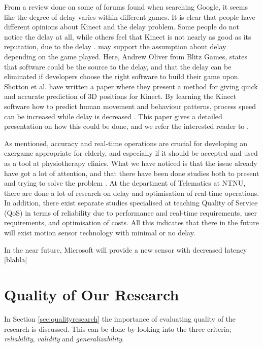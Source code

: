 From a review done on some of forums found when searching Google, it seems like the degree of delay varies within different games. It is clear that people have different opinions about Kinect and the delay problem. Some people do not notice the delay at all, while others feel that Kinect is not nearly as good as its reputation, due to the delay \cite{kinectLagForum1} \cite{kinectLagForum2}. \cite{kinectLag} may support the assumption about delay depending on the game played. Here, Andrew Oliver from Blitz Games, states that software could be the source to the delay, and that the delay can be eliminated if developers choose the right software to build their game upon. Shotton et al. have written a paper where they present a method for giving quick and accurate prediction of 3D positions for Kinect. By learning the Kinect software how to predict human movement and behaviour patterns, process speed can be increased while delay is decreased \cite{artikkelKinectLag} \cite{artikkelKinectLagIntro}. This paper gives a detailed presentation on how this could be done, and we refer the interested reader to \cite{artikkelKinectLag}.       

As mentioned, accuracy and real-time operations are crucial for developing an exergame appropriate for elderly, and especially if it should be accepted and used as a tool at physiotherapy clinics. What we have noticed is that the issue already have got a lot of attention, and that there have been done studies both to present and trying to solve the problem \cite{artikkelKinectLag} \cite{leyvand2011kinect}. At the department of Telematics at NTNU, there are done a lot of research on delay and optimisation of real-time operations. In addition, there exist separate studies specialised at teaching Quality of Service (QoS) in terms of reliability due to performance and real-time requirements, user requirements, and optimisation of costs. All this indicates that there in the future will exist motion sensor technology with minimal or no delay. 

In the near future, Microsoft will provide a new sensor with decreased latency [blabla] 

\section{Quality of Our Research}
\label{sec:qualityofresearch}

In Section \ref{sec:qualityresearch} the importance of evaluating quality of the research is discussed. This can be done by looking into the three criteria; \emph{reliability}, \emph{validity} and \emph{generalizability}.    

